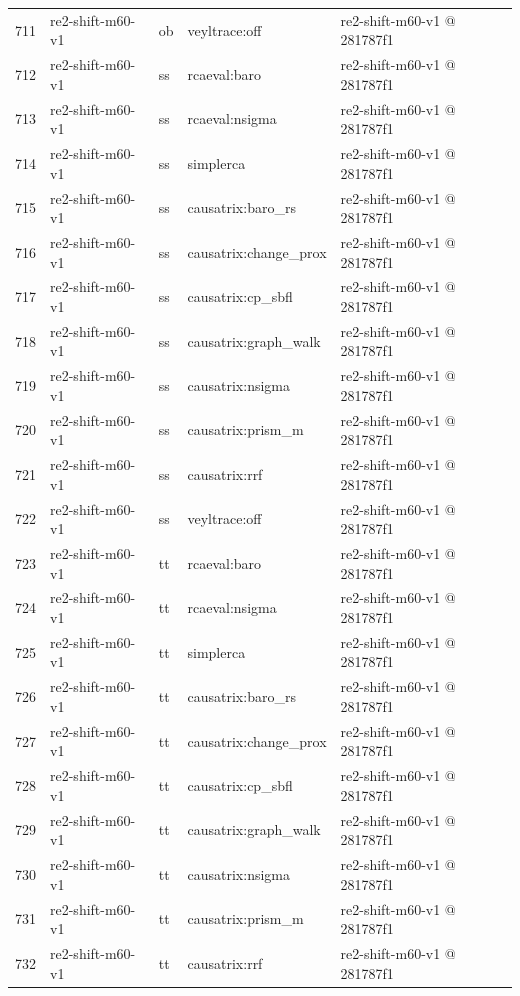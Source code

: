 \begin{longtable}{@{}r>{\raggedright\arraybackslash}p{87.0pt}>{\raggedright\arraybackslash}p{18.0pt}>{\raggedright\arraybackslash}p{63.0pt}>{\raggedright\arraybackslash}p{108.0pt}@{}}
711 & re2-shift-m60-v1 & ob & veyltrace:off & re2-shift-m60-v1 @ 281787f1 \\
712 & re2-shift-m60-v1 & ss & rcaeval:baro & re2-shift-m60-v1 @ 281787f1 \\
713 & re2-shift-m60-v1 & ss & rcaeval:nsigma & re2-shift-m60-v1 @ 281787f1 \\
714 & re2-shift-m60-v1 & ss & simplerca & re2-shift-m60-v1 @ 281787f1 \\
715 & re2-shift-m60-v1 & ss & causatrix:baro\_rs & re2-shift-m60-v1 @ 281787f1 \\
716 & re2-shift-m60-v1 & ss & causatrix:change\_prox & re2-shift-m60-v1 @ 281787f1 \\
717 & re2-shift-m60-v1 & ss & causatrix:cp\_sbfl & re2-shift-m60-v1 @ 281787f1 \\
718 & re2-shift-m60-v1 & ss & causatrix:graph\_walk & re2-shift-m60-v1 @ 281787f1 \\
719 & re2-shift-m60-v1 & ss & causatrix:nsigma & re2-shift-m60-v1 @ 281787f1 \\
720 & re2-shift-m60-v1 & ss & causatrix:prism\_m & re2-shift-m60-v1 @ 281787f1 \\
721 & re2-shift-m60-v1 & ss & causatrix:rrf & re2-shift-m60-v1 @ 281787f1 \\
722 & re2-shift-m60-v1 & ss & veyltrace:off & re2-shift-m60-v1 @ 281787f1 \\
723 & re2-shift-m60-v1 & tt & rcaeval:baro & re2-shift-m60-v1 @ 281787f1 \\
724 & re2-shift-m60-v1 & tt & rcaeval:nsigma & re2-shift-m60-v1 @ 281787f1 \\
725 & re2-shift-m60-v1 & tt & simplerca & re2-shift-m60-v1 @ 281787f1 \\
726 & re2-shift-m60-v1 & tt & causatrix:baro\_rs & re2-shift-m60-v1 @ 281787f1 \\
727 & re2-shift-m60-v1 & tt & causatrix:change\_prox & re2-shift-m60-v1 @ 281787f1 \\
728 & re2-shift-m60-v1 & tt & causatrix:cp\_sbfl & re2-shift-m60-v1 @ 281787f1 \\
729 & re2-shift-m60-v1 & tt & causatrix:graph\_walk & re2-shift-m60-v1 @ 281787f1 \\
730 & re2-shift-m60-v1 & tt & causatrix:nsigma & re2-shift-m60-v1 @ 281787f1 \\
731 & re2-shift-m60-v1 & tt & causatrix:prism\_m & re2-shift-m60-v1 @ 281787f1 \\
732 & re2-shift-m60-v1 & tt & causatrix:rrf & re2-shift-m60-v1 @ 281787f1 \\

\end{longtable}
